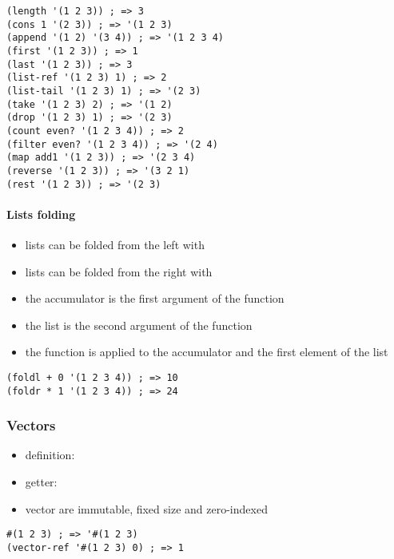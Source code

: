 \documentclass[a4paper,landscape,10pt]{article}
\begin{document}
\begin{multicols*}{2}
  \begin{lstlisting}[language=Racket]
(length '(1 2 3)) ; => 3
(cons 1 '(2 3)) ; => '(1 2 3)
(append '(1 2) '(3 4)) ; => '(1 2 3 4)
(first '(1 2 3)) ; => 1
(last '(1 2 3)) ; => 3
(list-ref '(1 2 3) 1) ; => 2
(list-tail '(1 2 3) 1) ; => '(2 3)
(take '(1 2 3) 2) ; => '(1 2)
(drop '(1 2 3) 1) ; => '(2 3)
(count even? '(1 2 3 4)) ; => 2
(filter even? '(1 2 3 4)) ; => '(2 4)
(map add1 '(1 2 3)) ; => '(2 3 4)
(reverse '(1 2 3)) ; => '(3 2 1)
(rest '(1 2 3)) ; => '(2 3)
\end{lstlisting}

  \vfill

  \paragraph{Lists folding}

  \begin{itemize}
    \item lists can be folded from the left with 
    \item lists can be folded from the right with 
    \item the accumulator is the first argument of the function
    \item the list is the second argument of the function
    \item the function is applied to the accumulator and the first element of the list
  \end{itemize}

  \begin{lstlisting}[language=Racket]
(foldl + 0 '(1 2 3 4)) ; => 10
(foldr * 1 '(1 2 3 4)) ; => 24
  \end{lstlisting}

  \subsubsection{Vectors}

  \begin{itemize}
    \item definition: 
    \item getter: 
    \item vector are immutable, fixed size and zero-indexed
  \end{itemize}

  \begin{lstlisting}[language=Racket]
#(1 2 3) ; => '#(1 2 3)
(vector-ref '#(1 2 3) 0) ; => 1
  \end{lstlisting}


\end{multicols*}
\end{document}
